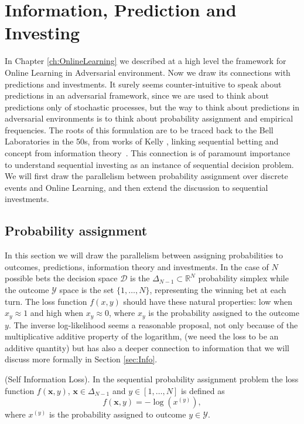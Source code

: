 \chapter{Information, Prediction and Investing}\label{ch:OPO}

In Chapter \ref{ch:OnlineLearning} we described at a high level the framework for Online Learning in Adversarial environment. Now we draw its connections with predictions and investments. It surely seems counter-intuitive to speak about predictions in an adversarial framework, since we are used to think about predictions only of stochastic processes, but the way to think about predictions in adversarial environments is to think about probability assignment and empirical frequencies. The roots of this formulation are to be traced back to the Bell Laboratories in the 50s, from works of Kelly \cite{kelly2011new}, linking sequential betting and concept from information theory~\cite{cover2012elements}. This connection is of paramount importance to understand sequential investing as an instance of sequential decision problem.
We will first draw the parallelism between probability assignment over discrete events and Online Learning, and then extend the discussion to sequential investments.

\section{Probability assignment}
In this section we will draw the parallelism between assigning probabilities to outcomes, predictions, information theory and investments.  
In the case of $N$ possible bets the decision space $\mathcal D$ is the $\Delta_{N-1}\subset \mathbb R^{N}$ probability simplex while the outcome $\mathcal Y$ space is the set $\{1,\ldots,N\}$, representing the winning bet at each turn. The loss function $f(x,y)$ should have these natural properties: low when $x_y\approx1$ and high when $x_y\approx0$, where $x_y$ is the probability assigned to the outcome $y$. The inverse log-likelihood seems a reasonable proposal, not only because of the multiplicative additive property of the logarithm, (we need the loss to be an additive quantity) but has also a deeper connection to information that we will discuss more formally in Section \ref{sec:Info}.

\begin{definition}(Self Information Loss).\label{def:log_loss}
    In the sequential probability assignment problem the loss function $f(\mathbf x,y)$, $\mathbf x\in \Delta_{N-1}$ and $y\in[1,\ldots,N]$ is defined as
    $$f(\mathbf x,y)=-\log\left(x^{(y)}\right),$$
where $x^{(y)}$ is the probability assigned to outcome $y\in\mathcal Y$.
\end{definition}

